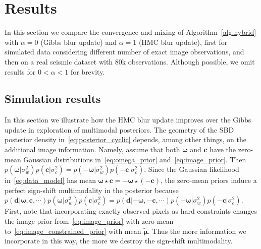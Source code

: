 \documentclass[12pt]{article}
\begin{document}
\section{Results} \label{sec:results}
In this section we compare the convergence and mixing of Algorithm~\ref{alg:hybrid} with $\alpha=0$ (Gibbs blur update) and $\alpha=1$ (HMC blur update),
first for simulated data considering different number of exact image observations, and then on a real seismic dataset with 80k observations. Although possible, we omit results for $0 < \alpha < 1$ for brevity.

\subsection{Simulation results} \label{sec:constraints}
In this section we illustrate how the HMC blur update improves over the Gibbs update in exploration of multimodal posteriors. 
The geometry of the SBD posterior density in~\eqref{eq:posterior_cyclic} depends, among other things, on the additional image information. Namely, assume that both $\bm{\omega}$ and $\bm{c}$ have the zero-mean Gaussian distributions in~\eqref{eq:omega_prior} and~\eqref{eq:image_prior}. Then $p(\bm{\omega}|\sigma_w^2)p(\bm{c}|\sigma_c^2) = p(-\bm{\omega}|\sigma_w^2)p(-\bm{c}|\sigma_c^2)$. 
Since the Gaussian likelihood in~\eqref{eq:data_model} has mean $\bm{\omega} \star \bm{c}= -\bm{\omega} \star (-\bm{c})$, the zero-mean priors induce a perfect sign-shift multimodality in the posterior because $p(\bm{d}|\bm{\omega}, \bm{c}, \cdots)p(\bm{\omega}|\sigma_w^2)p(\bm{c}|\sigma_c^2) = p(\bm{d}|-\bm{\omega}, -\bm{c}, \cdots)p(-\bm{\omega}|\sigma_w^2)p(-\bm{c}|\sigma_c^2)$.
First, note that incorporating exactly observed pixels as hard constraints changes the image prior from~\eqref{eq:image_prior} with zero mean to~\eqref{eq:image_constrained_prior} with mean $\tilde{\bm{\mu}}$. 
Thus the more information we incorporate in this way, the more we destroy the sign-shift multimodality. 
\end{document}
